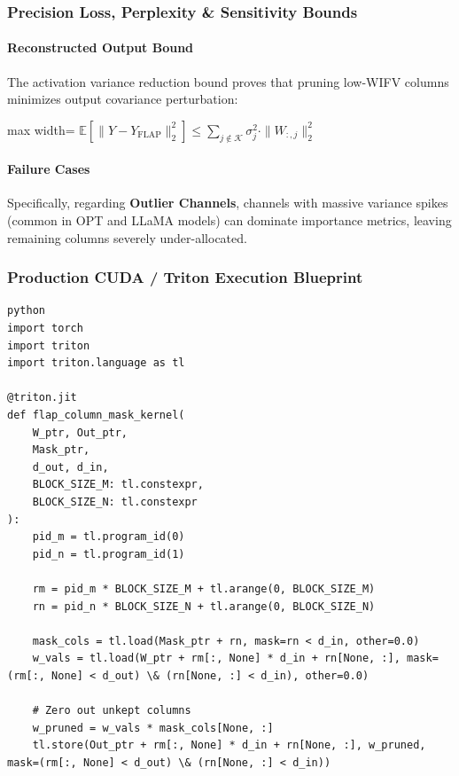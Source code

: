 \subsubsection*{Precision Loss, Perplexity \& Sensitivity Bounds}

\paragraph{Reconstructed Output Bound}

The activation variance reduction bound proves that pruning low-WIFV columns minimizes output covariance perturbation:

\begin{center}
\begin{adjustbox}{max width=\columnwidth}
$\displaystyle
\mathbb{E}\left[ \| Y - Y_{\text{FLAP}} \|_2^2 \right] \le \sum_{j \notin \mathcal{K}} \sigma_j^2 \cdot \| W_{:, j} \|_2^2
$
\end{adjustbox}
\end{center}

\paragraph{Failure Cases}

Specifically, regarding \textbf{Outlier Channels}, channels with massive variance spikes (common in OPT and LLaMA models) can dominate importance metrics, leaving remaining columns severely under-allocated.



\subsubsection*{Production CUDA / Triton Execution Blueprint}

\vspace{0.5em}
\begin{mdframed}[backgroundcolor=codebg, linecolor=codeframe, linewidth=1pt, roundcorner=4pt, innerleftmargin=2pt, innerrightmargin=5pt, innertopmargin=5pt, innerbottommargin=5pt]
\begin{lstlisting}
python
import torch
import triton
import triton.language as tl

@triton.jit
def flap_column_mask_kernel(
    W_ptr, Out_ptr,
    Mask_ptr,
    d_out, d_in,
    BLOCK_SIZE_M: tl.constexpr,
    BLOCK_SIZE_N: tl.constexpr
):
    pid_m = tl.program_id(0)
    pid_n = tl.program_id(1)

    rm = pid_m * BLOCK_SIZE_M + tl.arange(0, BLOCK_SIZE_M)
    rn = pid_n * BLOCK_SIZE_N + tl.arange(0, BLOCK_SIZE_N)

    mask_cols = tl.load(Mask_ptr + rn, mask=rn < d_in, other=0.0)
    w_vals = tl.load(W_ptr + rm[:, None] * d_in + rn[None, :], mask=(rm[:, None] < d_out) \& (rn[None, :] < d_in), other=0.0)

    # Zero out unkept columns
    w_pruned = w_vals * mask_cols[None, :]
    tl.store(Out_ptr + rm[:, None] * d_in + rn[None, :], w_pruned, mask=(rm[:, None] < d_out) \& (rn[None, :] < d_in))
\end{lstlisting}
\end{mdframed}
\vspace{0.5em}


